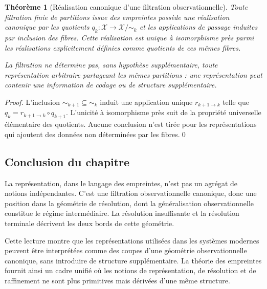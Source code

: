 \documentclass[11pt,a4paper,openany]{book}
\newtheorem{theorem}[definition]{Théorème}
\begin{document}
\begin{theorem}[Réalisation canonique d'une filtration observationnelle]
Toute filtration finie de partitions issue des empreintes possède une réalisation canonique par les quotients \(q_k:\mathcal X\to\mathcal X/{\sim_k}\) et les applications de passage induites par inclusion des fibres. Cette réalisation est unique à isomorphisme près parmi les réalisations explicitement définies comme quotients de ces mêmes fibres.

La filtration ne détermine pas, sans hypothèse supplémentaire, toute représentation arbitraire partageant les mêmes partitions : une représentation peut contenir une information de codage ou de structure supplémentaire.
\end{theorem}
\begin{proof}
L'inclusion \(\sim_{k+1}\subseteq\sim_k\) induit une application unique \(r_{k+1\to k}\) telle que \(q_k=r_{k+1\to k}\circ q_{k+1}\). L'unicité à isomorphisme près suit de la propriété universelle élémentaire des quotients. Aucune conclusion n'est tirée pour les représentations qui ajoutent des données non déterminées par les fibres.\qed\end{proof}


\subsection{Conclusion du chapitre}

La représentation, dans le langage des empreintes, n'est pas un agrégat de notions indépendantes. C'est une filtration observationnelle canonique, donc une position dans la géométrie de résolution, dont la généralisation observationnelle constitue le régime intermédiaire. La résolution insuffisante et la résolution terminale décrivent les deux bords de cette géométrie.

Cette lecture montre que les représentations utilisées dans les systèmes modernes peuvent être interprétées comme des coupes d'une géométrie observationnelle canonique, sans introduire de structure supplémentaire. La théorie des empreintes fournit ainsi un cadre unifié où les notions de représentation, de résolution et de raffinement ne sont plus primitives mais dérivées d'une même structure.


%










%
\end{document}
